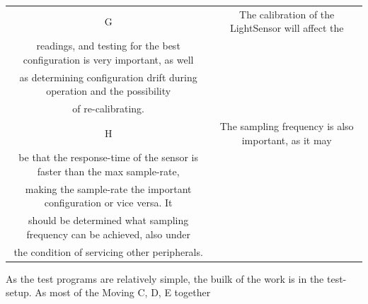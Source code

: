 \documentclass[11pt,a4]{article}
\begin{document}
\begin{table}[ht]
\begin{tabular}{c c}
G & The calibration of the LightSensor will affect the \\* readings, and testing for the best configuration is very important, as well \\* as determining configuration drift during operation and the possibility \\* of re-calibrating. \\
H & The sampling frequency is also important, as it may \\* be that the response-time of the sensor is faster than the max sample-rate, \\* making the sample-rate the important configuration or vice versa. It \\* should be determined what sampling frequency can be achieved, also under \\* the condition of servicing other peripherals. \\ [1ex]
\hline
\end{tabular}
\label{table:lightsensor_analysis_setup_description}
\end{table}
As the test programs are relatively simple, the builk of the work is in the test-setup. As most of the 
Moving C, D, E together
\end{document}
